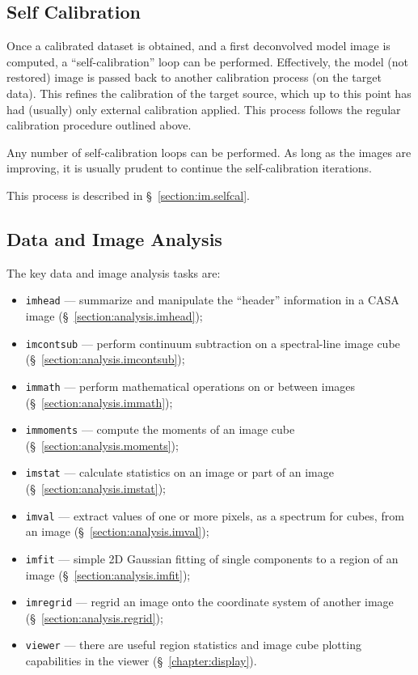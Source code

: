 \subsection{Self Calibration}
\label{section:intro.walkthru.selfcal}

Once a calibrated dataset is obtained, and a first deconvolved 
model image is computed, a ``self-calibration'' loop can be 
performed.  Effectively, the model (not restored) image is passed
back to another calibration process (on the target data).  This
refines the calibration of the target source, which up to this
point has had (usually) only external calibration applied.  This
process follows the regular calibration procedure outlined above.

Any number of self-calibration loops can be performed.  As long
as the images are improving, it is usually prudent to continue
the self-calibration iterations.

This process is described in \S~\ref{section:im.selfcal}.

\subsection{Data and Image Analysis}
\label{section:intro.walkthru.analysis}

The key data and image analysis tasks are:
\begin{itemize}
   \item {\tt imhead} --- summarize and manipulate the ``header'' 
         information in a CASA image 
         (\S~\ref{section:analysis.imhead});
   \item {\tt imcontsub} --- perform continuum subtraction on a
         spectral-line image cube 
         (\S~\ref{section:analysis.imcontsub});
   \item {\tt immath} --- perform mathematical operations on or
         between images
         (\S~\ref{section:analysis.immath});
   \item {\tt immoments} --- compute the moments of an image cube
         (\S~\ref{section:analysis.moments});
   \item {\tt imstat} --- calculate statistics on an image or part
         of an image
         (\S~\ref{section:analysis.imstat});
   \item {\tt imval} --- extract values of one or more pixels,
         as a spectrum for cubes, from an image
         (\S~\ref{section:analysis.imval});
   \item {\tt imfit} --- simple 2D Gaussian fitting of single
         components to a region of an image
         (\S~\ref{section:analysis.imfit});
   \item {\tt imregrid} --- regrid an image onto the coordinate
         system of another image 
         (\S~\ref{section:analysis.regrid});
   \item {\tt viewer} --- there are useful region statistics and
         image cube plotting capabilities in the viewer 
         (\S~\ref{chapter:display}).
\end{itemize}

